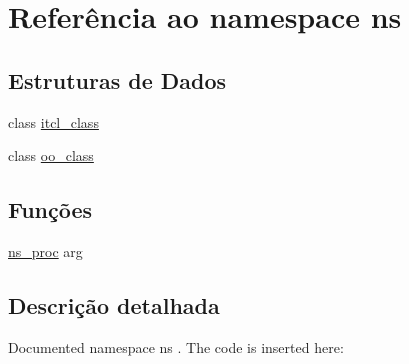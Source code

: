 \hypertarget{namespacens}{\section{Referência ao namespace ns}
\label{namespacens}
}
\subsection*{Estruturas de Dados}
\begin{DoxyCompactItemize}
\item 
class \hyperlink{classns_1_1itcl__class}{itcl\-\_\-class}
\item 
class \hyperlink{classns_1_1oo__class}{oo\-\_\-class}
\end{DoxyCompactItemize}
\subsection*{Funções}
\begin{DoxyCompactItemize}
\item 
\hyperlink{namespacens_a1429cbe84d32b17ea4783e5c5c00615b}{ns\-\_\-proc} arg
\end{DoxyCompactItemize}


\subsection{Descrição detalhada}
Documented namespace {\ttfamily ns} . The code is inserted here\-:


